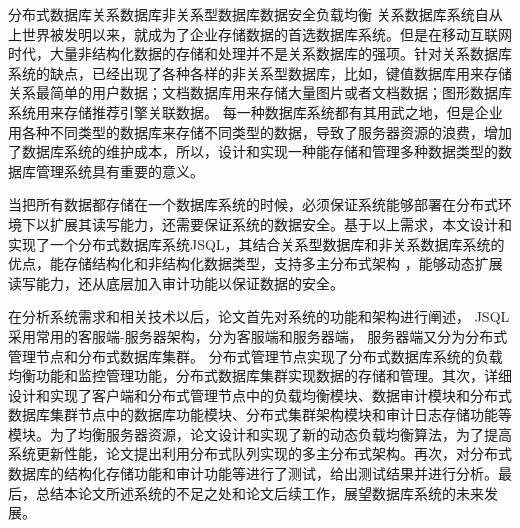 
\begin{Cabstract}{分布式数据库}{关系数据库}{非关系型数据库}{数据安全}{负载均衡}
关系数据库系统自从上世界被发明以来，就成为了企业存储数据的首选数据库系统。但是在移动互联网时代，大量非结构化数据的存储和处理并不是关系数据库的强项。针对关系数据库系统的缺点，已经出现了各种各样的非关系型数据库，比如，键值数据库用来存储关系最简单的用户数据；文档数据库用来存储大量图片或者文档数据；图形数据库系统用来存储推荐引擎关联数据。
每一种数据库系统都有其用武之地，但是企业用各种不同类型的数据库来存储不同类型的数据，导致了服务器资源的浪费，增加了数据库系统的维护成本，所以，设计和实现一种能存储和管理多种数据类型的数据库管理系统具有重要的意义。

当把所有数据都存储在一个数据库系统的时候，必须保证系统能够部署在分布式环境下以扩展其读写能力，还需要保证系统的数据安全。基于以上需求，本文设计和实现了一个分布式数据库系统JSQL，其结合关系型数据库和非关系数据库系统的优点，能存储结构化和非结构化数据类型，支持多主分布式架构 ，能够动态扩展读写能力，还从底层加入审计功能以保证数据的安全。

在分析系统需求和相关技术以后，论文首先对系统的功能和架构进行阐述，
JSQL采用常用的客服端-服务器架构，分为客服端和服务器端，
服务器端又分为分布式管理节点和分布式数据库集群。
分布式管理节点实现了分布式数据库系统的负载均衡功能和监控管理功能，分布式数据库集群实现数据的存储和管理。其次，详细设计和实现了客户端和分布式管理节点中的负载均衡模块、数据审计模块和分布式数据库集群节点中的数据库功能模块、分布式集群架构模块和审计日志存储功能等模块。为了均衡服务器资源，论文设计和实现了新的动态负载均衡算法，为了提高系统更新性能，论文提出利用分布式队列实现的多主分布式架构。再次，对分布式数据库的结构化存储功能和审计功能等进行了测试，给出测试结果并进行分析。最后，总结本论文所述系统的不足之处和论文后续工作，展望数据库系统的未来发展。
\end{Cabstract}